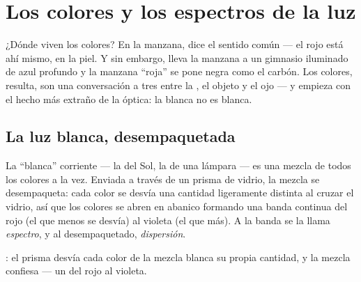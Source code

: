 \chapter{Los colores y los espectros de la luz}\label{ch:g8:colors-spectra}

¿Dónde viven los colores? En la manzana, dice el sentido común --- el
rojo está ahí mismo, en la piel. Y sin embargo, lleva la manzana a un
gimnasio iluminado de azul profundo y la manzana ``roja'' se pone negra
como el carbón. Los colores, resulta, son una conversación a tres entre
la , el objeto y el ojo --- y empieza con el hecho más extraño
de la óptica: la  blanca no es blanca.

\section{La luz blanca, desempaquetada}

\begin{proposition}\label{prop:g8:colors-spectra:mixture}
La  ``blanca'' corriente --- la del Sol, la de una lámpara ---
es una mezcla de todos los colores a la vez. Enviada a través de un
prisma de vidrio, la mezcla se desempaqueta: cada color se desvía una
cantidad ligeramente distinta al cruzar el vidrio, así que los colores
se abren en abanico formando una banda continua del rojo (el que menos
se desvía) al violeta (el que más). A la banda se la llama
\emph{espectro}, y al desempaquetado,
\emph{dispersión}.
\end{proposition}

\begin{omfigure}

{\small {}: el prisma desvía cada color de la mezcla
blanca su propia cantidad, y la mezcla confiesa --- un
 del rojo al violeta.}
\end{omfigure}


